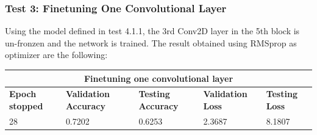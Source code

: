 \subsubsection{Test 3: Finetuning One Convolutional Layer}
Using the model defined in test 4.1.1, the 3rd Conv2D layer in the 5th block is un-fronzen and the network is trained. The result obtained using RMSprop as optimizer are the following:

 
 \medskip

\begin{tabular}{ |p{2cm}|p{2cm}|p{2cm}|p{2cm}|p{2cm}|  }
\hline
\multicolumn{5}{|c|}{Finetuning one convolutional layer} \\
\hline
\textbf{Epoch stopped} & \textbf{Validation Accuracy} & \textbf{Testing Accuracy} & \textbf{Validation Loss} & \textbf{Testing Loss} \\
\hline
28 & 0.7202 & 0.6253 & 2.3687 & 8.1807\\
\hline
\end{tabular}

\medskip

